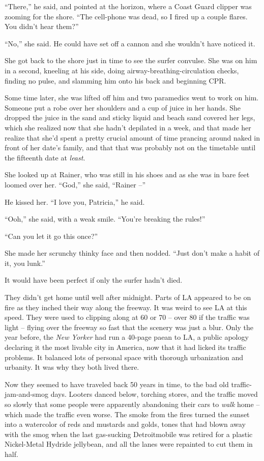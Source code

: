 “There,” he said, and pointed at the horizon, where a Coast Guard 
clipper was zooming for the shore. “The cell-phone was dead, so I 
fired up a couple flares. You didn't hear them?”

“No,” she said. He could have set off a cannon and she wouldn't 
have noticed it.

She got back to the shore just in time to see the surfer convulse. She 
was on him in a second, kneeling at his side, doing 
airway-breathing-circulation checks, finding no pulse, and slamming him 
onto his back and beginning CPR.

Some time later, she was lifted off him and two paramedics went to work 
on him. Someone put a robe over her shoulders and a cup of juice in her 
hands. She dropped the juice in the sand and sticky liquid and beach 
sand covered her legs, which she realized now that she hadn't depilated 
in a week, and that made her realize that she'd spent a pretty crucial 
amount of time prancing around naked in front of her date's family, and 
that that was probably not on the timetable until the fifteenth date at 
\emph{least}.

She looked up at Rainer, who was still in his shoes and as she was in 
bare feet loomed over her. “God,” she said, “Rainer --”

He kissed her. “I love you, Patricia,” he said.

“Ooh,” she said, with a weak smile. “You're breaking the rules!”

“Can you let it go this once?”

She made her scrunchy thinky face and then nodded. “Just don't make a 
habit of it, you lunk.”

\tb

It would have been perfect if only the surfer hadn't died.

They didn't get home until well after midnight. Parts of LA appeared to 
be on fire as they inched their way along the freeway. It was weird to 
see LA at this speed. They were used to clipping along at 60 or 70 -- 
over 80 if the traffic was light -- flying over the freeway so fast 
that the scenery was just a blur. Only the year before, the \emph{New 
Yorker} had run a 40-page paean to LA, a public apology declaring it 
the most livable city in America, now that it had licked its traffic 
problems. It balanced lots of personal space with thorough urbanization 
and urbanity. It was why they both lived there.

Now they seemed to have traveled back 50 years in time, to the bad old 
traffic-jam-and-smog days. Looters danced below, torching stores, and 
the traffic moved so slowly that some people were apparently abandoning 
their cars to \emph{walk} home -- which made the traffic even worse. 
The smoke from the fires turned the sunset into a watercolor of reds 
and mustards and golds, tones that had blown away with the smog when 
the last gas-sucking Detroitmobile was retired for a plastic 
Nickel-Metal Hydride jellybean, and all the lanes were repainted to cut 
them in half.

